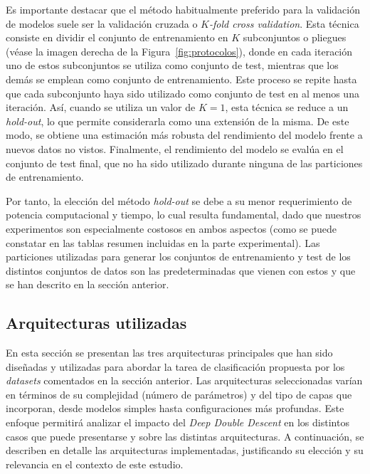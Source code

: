 Es importante destacar que el método habitualmente preferido para la validación de modelos suele ser la validación cruzada o \textit{$K$-fold cross validation}. Esta técnica consiste en dividir el conjunto de entrenamiento en $K$ subconjuntos o pliegues (véase la imagen derecha de la Figura~\ref{fig:protocolos}), donde en cada iteración uno de estos subconjuntos se utiliza como conjunto de test, mientras que los demás se emplean como conjunto de entrenamiento. Este proceso se repite hasta que cada subconjunto haya sido utilizado como conjunto de test en al menos una iteración. Así, cuando se utiliza un valor de $K = 1$, esta técnica se reduce a un \textit{hold-out}, lo que permite considerarla como una extensión de la misma. De este modo, se obtiene una estimación más robusta del rendimiento del modelo frente a nuevos datos no vistos. Finalmente, el rendimiento del modelo se evalúa en el conjunto de test final, que no ha sido utilizado durante ninguna de las particiones de entrenamiento.

Por tanto, la elección del método \textit{hold-out} se debe a su menor requerimiento de potencia computacional y tiempo, lo cual resulta fundamental, dado que nuestros experimentos son especialmente costosos en ambos aspectos (como se puede constatar en las tablas resumen incluidas en la parte experimental). Las particiones utilizadas para generar los conjuntos de entrenamiento y test de los distintos conjuntos de datos son las predeterminadas que vienen con estos y que se han descrito en la sección anterior.

\subsection{Arquitecturas utilizadas}\label{subsec:arquitecturas}

En esta sección se presentan las tres arquitecturas principales que han sido diseñadas y utilizadas para abordar la tarea de clasificación propuesta por los \textit{datasets} comentados en la sección anterior. Las arquitecturas seleccionadas varían en términos de su complejidad (número de parámetros) y del tipo de capas que incorporan, desde modelos simples hasta configuraciones más profundas. Este enfoque permitirá analizar el impacto del \textit{Deep Double Descent} en los distintos casos que puede presentarse y sobre las distintas arquitecturas. A continuación, se describen en detalle las arquitecturas implementadas, justificando su elección y su relevancia en el contexto de este estudio.

